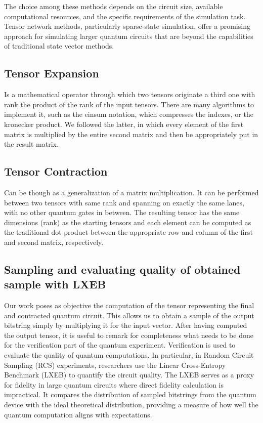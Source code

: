 \documentclass[12pt,oneside,a4paper]{article}
\begin{document}
The choice among these methods depends on the circuit size, available computational resources, and the specific requirements of the simulation task. Tensor network methods, particularly sparse-state simulation, offer a promising approach for simulating larger quantum circuits that are beyond the capabilities of traditional state vector methods.



\subsection{Tensor Expansion}
Is a mathematical operator through which two tensors originate a third one with rank the product of the rank of the input tensors. There are many algorithms to implement it, such as the einsum notation, which compresses the indexes, or the kronecker product. We followed the latter, in which every element of the first matrix is multiplied by the entire second matrix and then be appropriately put in the result matrix.

\subsection{Tensor Contraction}
Can be though as a generalization of a matrix multiplication. It can be performed between two tensors with same rank and spanning on exactly the same lanes, with no other quantum gates in between. The resulting tensor has the same dimensions (rank) as the starting tensors and each element can be computed as the traditional dot product between the appropriate row and column of the first and second matrix, respectively.


\subsection{Sampling and evaluating quality of obtained sample with LXEB}
Our work poses as objective the computation of the tensor representing the final and contracted quantum circuit. This allows us to obtain a sample of the output bitstring simply by multiplying it for the input vector. After having computed the output tensor, it is useful to remark for completeness what needs to be done for the verification part of the quantum experiment. Verification is used to evaluate the quality of quantum computations. In particular, in Random Circuit Sampling (RCS) experiments, researchers use the Linear Cross-Entropy Benchmark (LXEB) to quantify the circuit quality. The LXEB serves as a proxy for fidelity in large quantum circuits where direct fidelity calculation is impractical. It compares the distribution of sampled bitstrings from the quantum device with the ideal theoretical distribution, providing a measure of how well the quantum computation aligns with expectations.
\end{document}
